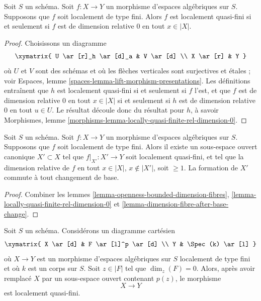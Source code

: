 \begin{lemma}
\label{lemma-locally-quasi-finite-rel-dimension-0}
Soit $S$ un schéma.
Soit $f : X \to Y$ un morphisme d'espaces algébriques sur $S$.
Supposons que $f$ soit localement de type fini.
Alors $f$ est localement quasi-fini si et seulement si $f$ est de
dimension relative $0$ en tout $x \in |X|$.
\end{lemma}

\begin{proof}
Choisissons un diagramme
$$
\xymatrix{
U \ar[r]_h \ar[d]_a & V \ar[d] \\
X \ar[r] & Y
}
$$
où $U$ et $V$ sont des schémas et où les flèches verticales sont surjectives et
étales ; voir
Espaces, lemme \ref{spaces-lemma-lift-morphism-presentations}.
Les définitions entraînent que
$h$ est localement quasi-fini si et seulement si $f$ l'est,
et que $f$ est de dimension relative $0$ en tout $x \in |X|$ si et
seulement si $h$ est de dimension relative $0$ en tout $u \in U$.
Le résultat découle donc du résultat pour $h$, à savoir
Morphismes, lemme \ref{morphisms-lemma-locally-quasi-finite-rel-dimension-0}.
\end{proof}

\begin{lemma}
\label{lemma-locally-finite-type-quasi-finite-part}
Soit $S$ un schéma.
Soit $f : X \to Y$ un morphisme d'espaces algébriques sur $S$.
Supposons que $f$ soit localement de type fini.
Alors il existe un sous-espace ouvert canonique $X' \subset X$ tel que
$f|_{X'} : X' \to Y$ soit localement quasi-fini, et tel que la
dimension relative de $f$ en tout $x \in |X|$, $x \not \in |X'|$, soit
$\geq 1$. La formation de $X'$ commute à tout changement de base.
\end{lemma}

\begin{proof}
Combiner les
lemmes \ref{lemma-openness-bounded-dimension-fibres},
\ref{lemma-locally-quasi-finite-rel-dimension-0} et
\ref{lemma-dimension-fibre-after-base-change}.
\end{proof}

\begin{lemma}
\label{lemma-quasi-finite-at-point}
Soit $S$ un schéma. Considérons un diagramme cartésien
$$
\xymatrix{
X \ar[d] & F \ar[l]^p \ar[d] \\
Y & \Spec(k) \ar[l]
}
$$
où $X \to Y$ est un morphisme d'espaces algébriques sur $S$
localement de type fini et où $k$ est un corps sur $S$.
Soit $z \in |F|$ tel que $\dim_z(F) = 0$. Alors, après avoir remplacé $X$
par un sous-espace ouvert contenant $p(z)$, le morphisme
$$
X \longrightarrow Y
$$
est localement quasi-fini.
\end{lemma}

